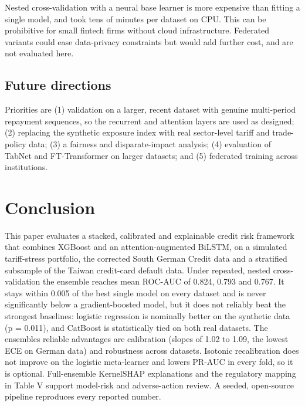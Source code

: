 \documentclass[conference,a4paper]{IEEEtran}
\begin{document}
Nested cross-validation with a neural base learner is more expensive than fitting a single model, and took tens of minutes per dataset on CPU. This can be prohibitive for small fintech firms without cloud infrastructure. Federated variants \cite{r6} could ease data-privacy constraints but would add further cost, and are not evaluated here.

\subsection{Future directions}

Priorities are (1) validation on a larger, recent dataset with genuine multi-period repayment sequences, so the recurrent and attention layers are used as designed; (2) replacing the synthetic exposure index with real sector-level tariff and trade-policy data; (3) a fairness and disparate-impact analysis; (4) evaluation of TabNet and FT-Transformer on larger datasets; and (5) federated training across institutions.

\section{Conclusion}

This paper evaluates a stacked, calibrated and explainable credit risk framework that combines XGBoost and an attention-augmented BiLSTM, on a simulated tariff-stress portfolio, the corrected South German Credit data and a stratified subsample of the Taiwan credit-card default data. Under repeated, nested cross-validation the ensemble reaches mean ROC-AUC of 0.824, 0.793 and 0.767. It stays within 0.005 of the best single model on every dataset and is never significantly below a gradient-boosted model, but it does not reliably beat the strongest baselines: logistic regression is nominally better on the synthetic data (p = 0.011), and CatBoost is statistically tied on both real datasets. The ensemble\textquotesingle s reliable advantages are calibration (slopes of 1.02 to 1.09, the lowest ECE on German data) and robustness across datasets. Isotonic recalibration does not improve on the logistic meta-learner and lowers PR-AUC in every fold, so it is optional. Full-ensemble KernelSHAP explanations and the regulatory mapping in Table V support model-risk and adverse-action review. A seeded, open-source pipeline reproduces every reported number.

\appendices
\end{document}

